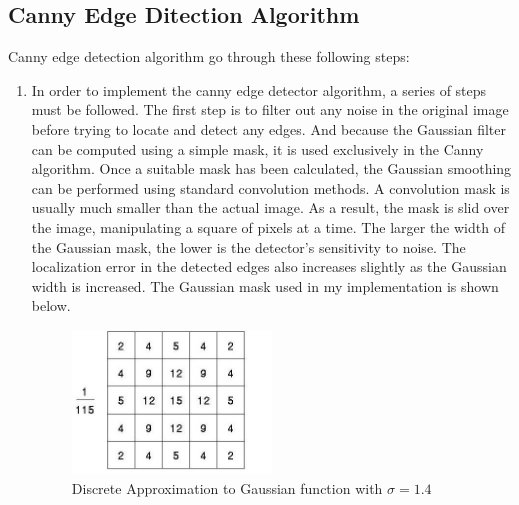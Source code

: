 \subsection{Canny Edge Ditection Algorithm}
Canny edge detection algorithm go through these following steps:
\begin{enumerate}
\item In order to implement the canny edge detector algorithm, a series of steps must be followed. The first step is to filter out any noise in the original image before trying to locate and detect any edges. And because the Gaussian filter can be computed using a simple mask, it is used exclusively in the Canny algorithm. Once a suitable mask has been calculated, the Gaussian smoothing can be performed using standard convolution methods. A convolution mask is usually much smaller than the actual image. As a result, the mask is slid over the image, manipulating a square of pixels at a time. The larger the width of the Gaussian mask, the lower is the detector's sensitivity to noise. The localization error in the detected edges also increases slightly as the Gaussian width is increased. The Gaussian mask used in my implementation is shown below. 

\begin{figure}[H]
\centering
\label{fig:GaussainMask} 
\includegraphics[width=0.5\textwidth]{GaussMask}
\caption {Discrete Approximation to Gaussian function with $\sigma = 1.4$}
\end{figure}



\end{enumerate}
